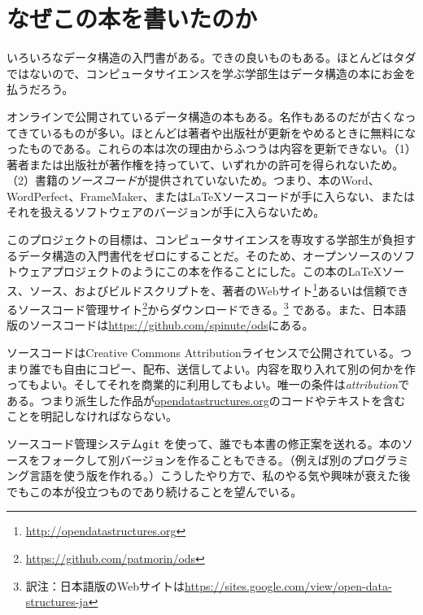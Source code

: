 \chapter*{なぜこの本を書いたのか}

いろいろなデータ構造の入門書がある。できの良いものもある。ほとんどはタダではないので、コンピュータサイエンスを学ぶ学部生はデータ構造の本にお金を払うだろう。

オンラインで公開されているデータ構造の本もある。名作もあるのだが古くなってきているものが多い。ほとんどは著者や出版社が更新をやめるときに無料になったものである。これらの本は次の理由からふつうは内容を更新できない。（1）著者または出版社が著作権を持っていて、いずれかの許可を得られないため。（2）書籍の\emph{ソースコード}が提供されていないため。つまり、本のWord、WordPerfect、FrameMaker、または\LaTeX{}ソースコードが手に入らない、またはそれを扱えるソフトウェアのバージョンが手に入らないため。

このプロジェクトの目標は、コンピュータサイエンスを専攻する学部生が負担するデータ構造の入門書代をゼロにすることだ。そのため、オープンソースのソフトウェアプロジェクトのようにこの本を作ることにした。この本の\LaTeX{}ソース、\lang{}ソース、およびビルドスクリプトを、著者のWebサイト\footnote {\url{http://opendatastructures.org}}あるいは信頼できるソースコード管理サイト\footnote {\url{https://github.com/patmorin/ods}}からダウンロードできる。\footnote {訳注：日本語版のWebサイトは\url{https://sites.google.com/view/open-data-structures-ja}} である。また、日本語版のソースコードは\url{https://github.com/spinute/ods}にある。

ソースコードはCreative Commons Attributionライセンスで公開されている。つまり誰でも自由にコピー、配布、送信してよい。内容を取り入れて別の何かを作ってもよい。そしてそれを商業的に利用してもよい。唯一の条件は\emph{attribution}である。つまり派生した作品が\url{opendatastructures.org}のコードやテキストを含むことを明記しなければならない。

ソースコード管理システム\texttt{git} を使って、誰でも本書の修正案を送れる。本のソースをフォークして別バージョンを作ることもできる。（例えば別のプログラミング言語を使う版を作れる。）こうしたやり方で、私のやる気や興味が衰えた後でもこの本が役立つものであり続けることを望んでいる。
